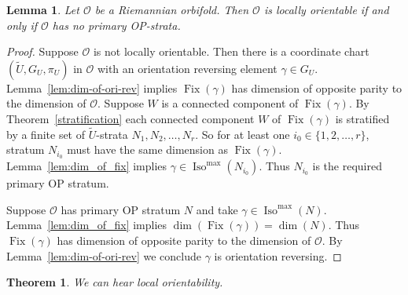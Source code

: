 \documentclass{amsart}
\theoremstyle{plain}
\newtheorem{theorem}[thm]{Theorem}
\newtheorem{lemma}[thm]{Lemma}
\theoremstyle{definition}
\theoremstyle{remark}
\newcommand{\wtu}{\widetilde{U}}
\newcommand{\orb}{\mathcal O}
\newcommand{\cc}{(\widetilde{U}, G_U, \pi_U)}
\DeclareMathOperator{\iso}{Iso}
\DeclareMathOperator{\fix}{Fix}
\begin{document}
\begin{lemma}\label{orinop} Let $\orb$ be a Riemannian orbifold. Then $\orb$ is locally orientable if and only if $\orb$ has no primary OP-strata.
\end{lemma}

\begin{proof}
Suppose $\orb$ is not locally orientable. Then there is a coordinate chart $\cc$ in $\orb$ with an orientation reversing element $\gamma \in G_U$. Lemma~\ref{lem:dim-of-ori-rev} implies $\fix(\gamma)$ has dimension of opposite parity to the dimension of $\orb$. Suppose $W$ is a connected component of  $\fix(\gamma)$. By Theorem~\ref{stratification} each connected component $W$ of  $\fix(\gamma)$ is stratified by a finite set of $\wtu$-strata $N_1, N_2, \dots, N_r$. So for at least one $i_0 \in \{1, 2, \dots, r\}$, stratum $N_{i_0}$ must have the same dimension as $\fix(\gamma)$. Lemma~\ref{lem:dim_of_fix} implies $\gamma \in \iso^{\max}(N_{i_0})$. Thus $N_{i_0}$ is the required primary OP stratum.

Suppose $\orb$ has primary OP stratum $N$ and take $\gamma \in \iso^{\max}(N)$. Lemma~\ref{lem:dim_of_fix} implies $\dim(\fix(\gamma))= \dim(N)$. Thus $\fix(\gamma)$ has dimension of opposite parity to the dimension of $\orb$. By Lemma~\ref{lem:dim-of-ori-rev} we conclude $\gamma$ is orientation reversing.
\end{proof}


\begin{theorem}  We can hear local orientability.
\end{theorem}
\end{document}
